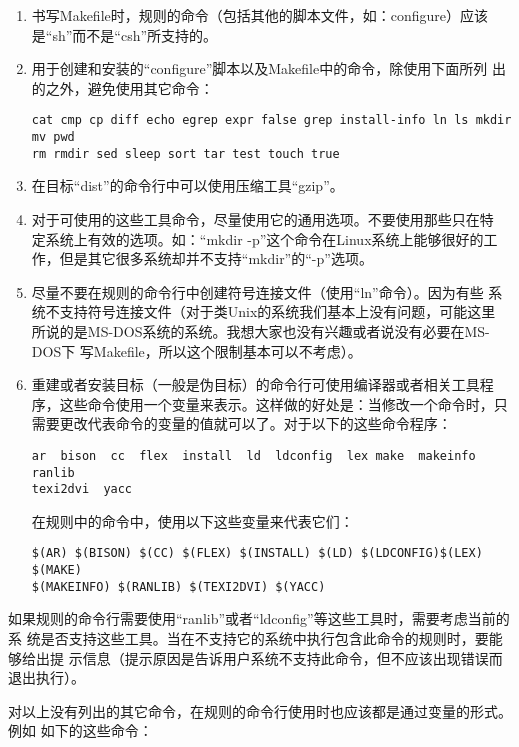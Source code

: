 \begin{enumerate}
  \item 书写Makefile时，规则的命令（包括其他的脚本文件，如：configure）应该
      是“sh”而不是“csh”所支持的。
  \item 用于创建和安装的“configure”脚本以及Makefile中的命令，除使用下面所列
      出的之外，避免使用其它命令：
\begin{Verbatim}[]
cat cmp cp diff echo egrep expr false grep install-info ln ls mkdir mv pwd
rm rmdir sed sleep sort tar test touch true
\end{Verbatim}

  \item 在目标“dist”的命令行中可以使用压缩工具“gzip”。
  \item 对于可使用的这些工具命令，尽量使用它的通用选项。不要使用那些只在特
      定系统上有效的选项。如：“mkdir -p”这个命令在Linux系统上能够很好的工
      作，但是其它很多系统却并不支持“mkdir”的“-p”选项。
  \item 尽量不要在规则的命令行中创建符号连接文件（使用“ln”命令）。因为有些
      系统不支持符号连接文件（对于类Unix的系统我们基本上没有问题，可能这里
      所说的是MS-DOS系统的系统。我想大家也没有兴趣或者说没有必要在MS-DOS下
      写Makefile，所以这个限制基本可以不考虑）。
  \item 重建或者安装目标（一般是伪目标）的命令行可使用编译器或者相关工具程
      序，这些命令使用一个变量来表示。这样做的好处是：当修改一个命令时，只
      需要更改代表命令的变量的值就可以了。对于以下的这些命令程序：
\begin{Verbatim}[]
ar  bison  cc  flex  install  ld  ldconfig  lex make  makeinfo  ranlib
texi2dvi  yacc
\end{Verbatim}

在规则中的命令中，使用以下这些变量来代表它们：

\begin{Verbatim}[]
$(AR) $(BISON) $(CC) $(FLEX) $(INSTALL) $(LD) $(LDCONFIG)$(LEX) $(MAKE)
$(MAKEINFO) $(RANLIB) $(TEXI2DVI) $(YACC)
\end{Verbatim}



\end{enumerate}

如果规则的命令行需要使用“ranlib”或者“ldconfig”等这些工具时，需要考虑当前的系
统是否支持这些工具。当在不支持它的系统中执行包含此命令的规则时，要能够给出提
示信息（提示原因是告诉用户系统不支持此命令，但不应该出现错误而退出执行）。

对以上没有列出的其它命令，在规则的命令行使用时也应该都是通过变量的形式。例如
如下的这些命令：

